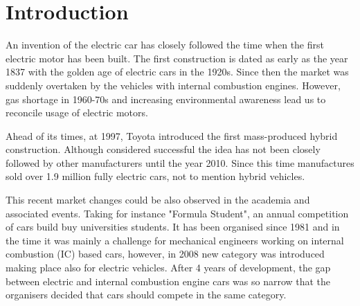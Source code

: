 





\chapter{Introduction}

An invention of the electric car has closely followed the time when the first electric motor has been built. The first construction is dated as early as the year 1837 with the golden age of electric cars in the 1920s. Since then the market was suddenly overtaken by the vehicles with internal combustion engines. However, gas shortage in 1960-70s and increasing environmental awareness lead us to reconcile usage of electric motors.

Ahead of its times, at 1997, Toyota introduced the first mass-produced hybrid construction. Although considered successful the idea has not been closely followed by other manufacturers until the year 2010. Since this time manufactures sold over 1.9 million fully electric cars, not to mention hybrid vehicles. 

This recent market changes could be also observed in the academia and associated events. Taking for instance "Formula Student", an annual competition of cars build buy universities students. It has been organised since 1981 and in the time it was mainly a challenge for mechanical engineers working on internal combustion (IC) based cars, however, in 2008 new category was introduced making place also for electric vehicles.
After 4 years of development, the gap between electric and internal combustion engine cars was so narrow that the organisers decided that cars should compete in the same category.

